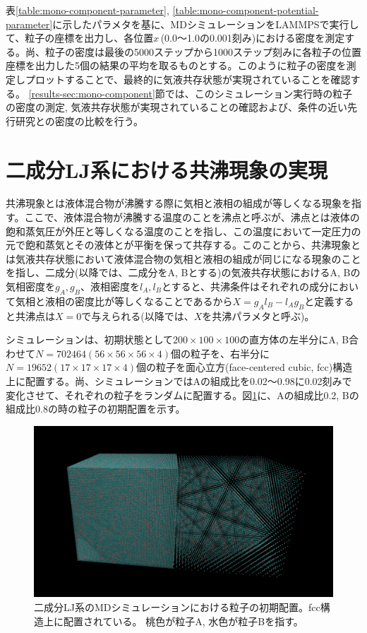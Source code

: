\documentclass[titlepage]{jsreport}
\begin{document}
表\ref{table:mono-component-parameter}, \ref{table:mono-component-potential-parameter}に示したパラメタを基に、MDシミュレーションをLAMMPSで実行して、粒子の座標を出力し、各位置$x$\,(0.0〜1.0の0.001刻み)における密度を測定する。尚、粒子の密度は最後の5000ステップから1000ステップ刻みに各粒子の位置座標を出力した5個の結果の平均を取るものとする。このように粒子の密度を測定しプロットすることで、最終的に気液共存状態が実現されていることを確認する。
\ref{results-sec:mono-component}節では、このシミュレーション実行時の粒子の密度の測定, 気液共存状態が実現されていることの確認および、条件の近い先行研究との密度の比較を行う。


\section{二成分LJ系における共沸現象の実現} \label{method-sec:bi-component-azeotrope}
共沸現象とは液体混合物が沸騰する際に気相と液相の組成が等しくなる現象を指す。ここで、液体混合物が沸騰する温度のことを沸点と呼ぶが、沸点とは液体の飽和蒸気圧が外圧と等しくなる温度のことを指し\cite{boiling-point}、この温度において一定圧力の元で飽和蒸気とその液体とが平衡を保って共存する。このことから、共沸現象とは気液共存状態において液体混合物の気相と液相の組成が同じになる現象のことを指し、二成分(以降では、二成分をA, Bとする)の気液共存状態におけるA, Bの気相密度を$g_A, g_B$、液相密度を$l_A, l_B$とすると、共沸条件はそれぞれの成分において気相と液相の密度比が等しくなることであるから$X=g_Al_B-l_Ag_B$と定義すると共沸点は$X=0$で与えられる(以降では、$X$を共沸パラメタと呼ぶ)。

シミュレーションは、初期状態として$200×100×100$の直方体の左半分にA, B合わせて$N=702464(56×56×56×4)$個の粒子を、右半分に$N=19652(17×17×17×4)$個の粒子を面心立方(face-centered cubic, fcc)構造上に配置する。尚、シミュレーションではAの組成比を0.02〜0.98に0.02刻みで変化させて、それぞれの粒子をランダムに配置する。図\ref{fig:lan140493-lbn561971-ran3930-rbn15722-first}に、Aの組成比0.2, Bの組成比0.8の時の粒子の初期配置を示す。

\begin{figure}[htbp]
    \begin{center}
        \includegraphics[width=14cm]{fig/lan140493-lbn561971-ran3930-rbn15722/lan140493-lbn561971-ran3930-rbn15722-first.png}
    \end{center}
    \caption{二成分LJ系のMDシミュレーションにおける粒子の初期配置。fcc構造上に配置されている。
    桃色が粒子A, 水色が粒子Bを指す。}
    \label{fig:lan140493-lbn561971-ran3930-rbn15722-first}
\end{figure}
\end{document}

